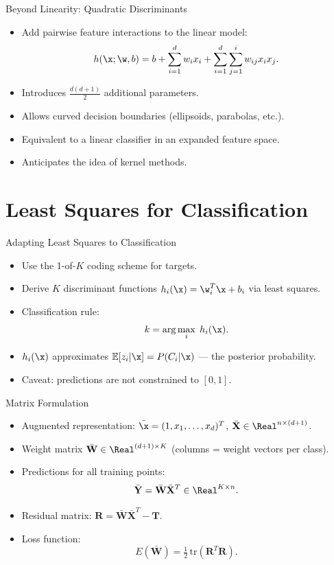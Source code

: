 \begin{frame}{Beyond Linearity: Quadratic Discriminants}
  \begin{itemize}
    \item Add pairwise feature interactions to the linear model:
    \[
      h(\x;\w,b) = b + \sum_{i=1}^{d} w_i x_i + \sum_{i=1}^{d}\sum_{j=1}^{i} w_{ij} x_i x_j.
    \]
    \item Introduces $\frac{d(d+1)}{2}$ additional parameters.
    \item Allows \alert{curved decision boundaries} (ellipsoids, parabolas, etc.).
    \item Equivalent to a linear classifier in an \alert{expanded feature space}.
    \item Anticipates the idea of \alert{kernel methods}.
  \end{itemize}
\end{frame}

\section{Least Squares for Classification}

\begin{frame}{Adapting Least Squares to Classification}
  \begin{itemize}
    \item Use the \alert{1-of-$K$} coding scheme for targets.
    \item Derive $K$ discriminant functions $h_i(\x) = \w_i^T\x + b_i$ via least squares.
    \item Classification rule:
    \[
      k = \arg\max_{i}\; h_i(\x).
    \]
    \item $h_i(\x)$ approximates $\mathbb{E}[z_i|\x] = P(C_i|\x)$ — the \alert{posterior probability}.
    \item Caveat: predictions are not constrained to $[0,1]$.
  \end{itemize}
\end{frame}

\begin{frame}{Matrix Formulation}
  \begin{itemize}
    \item Augmented representation: $\bar{\x} = (1, x_1,\ldots,x_d)^T$, $\bar{\mathbf{X}} \in \Real^{n \times (d+1)}$.
    \item Weight matrix $\bar{\mathbf{W}} \in \Real^{(d+1)\times K}$ (columns = weight vectors per class).
    \item Predictions for all training points:
    \[
      \bar{\mathbf{Y}} = \bar{\mathbf{W}}\bar{\mathbf{X}}^T \in \Real^{K \times n}.
    \]
    \item Residual matrix: $\mathbf{R} = \bar{\mathbf{W}}\bar{\mathbf{X}}^T - \mathbf{T}$.
    \item Loss function:
    \[
      E(\bar{\mathbf{W}}) = \tfrac{1}{2}\,\mathrm{tr}\!\left(\mathbf{R}^T\mathbf{R}\right).
    \]
  \end{itemize}
\end{frame}


